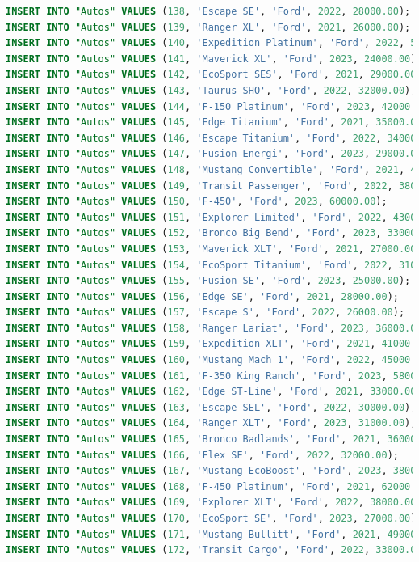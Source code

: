 \documentclass[12pt]{article}
\begin{document}
\begin{lstlisting}[language=SQL]
INSERT INTO "Autos" VALUES (138, 'Escape SE', 'Ford', 2022, 28000.00);
INSERT INTO "Autos" VALUES (139, 'Ranger XL', 'Ford', 2021, 26000.00);
INSERT INTO "Autos" VALUES (140, 'Expedition Platinum', 'Ford', 2022, 50000.00);
INSERT INTO "Autos" VALUES (141, 'Maverick XL', 'Ford', 2023, 24000.00);
INSERT INTO "Autos" VALUES (142, 'EcoSport SES', 'Ford', 2021, 29000.00);
INSERT INTO "Autos" VALUES (143, 'Taurus SHO', 'Ford', 2022, 32000.00);
INSERT INTO "Autos" VALUES (144, 'F-150 Platinum', 'Ford', 2023, 42000.00);
INSERT INTO "Autos" VALUES (145, 'Edge Titanium', 'Ford', 2021, 35000.00);
INSERT INTO "Autos" VALUES (146, 'Escape Titanium', 'Ford', 2022, 34000.00);
INSERT INTO "Autos" VALUES (147, 'Fusion Energi', 'Ford', 2023, 29000.00);
INSERT INTO "Autos" VALUES (148, 'Mustang Convertible', 'Ford', 2021, 47000.00);
INSERT INTO "Autos" VALUES (149, 'Transit Passenger', 'Ford', 2022, 38000.00);
INSERT INTO "Autos" VALUES (150, 'F-450', 'Ford', 2023, 60000.00);
INSERT INTO "Autos" VALUES (151, 'Explorer Limited', 'Ford', 2022, 43000.00);
INSERT INTO "Autos" VALUES (152, 'Bronco Big Bend', 'Ford', 2023, 33000.00);
INSERT INTO "Autos" VALUES (153, 'Maverick XLT', 'Ford', 2021, 27000.00);
INSERT INTO "Autos" VALUES (154, 'EcoSport Titanium', 'Ford', 2022, 31000.00);
INSERT INTO "Autos" VALUES (155, 'Fusion SE', 'Ford', 2023, 25000.00);
INSERT INTO "Autos" VALUES (156, 'Edge SE', 'Ford', 2021, 28000.00);
INSERT INTO "Autos" VALUES (157, 'Escape S', 'Ford', 2022, 26000.00);
INSERT INTO "Autos" VALUES (158, 'Ranger Lariat', 'Ford', 2023, 36000.00);
INSERT INTO "Autos" VALUES (159, 'Expedition XLT', 'Ford', 2021, 41000.00);
INSERT INTO "Autos" VALUES (160, 'Mustang Mach 1', 'Ford', 2022, 45000.00);
INSERT INTO "Autos" VALUES (161, 'F-350 King Ranch', 'Ford', 2023, 58000.00);
INSERT INTO "Autos" VALUES (162, 'Edge ST-Line', 'Ford', 2021, 33000.00);
INSERT INTO "Autos" VALUES (163, 'Escape SEL', 'Ford', 2022, 30000.00);
INSERT INTO "Autos" VALUES (164, 'Ranger XLT', 'Ford', 2023, 31000.00);
INSERT INTO "Autos" VALUES (165, 'Bronco Badlands', 'Ford', 2021, 36000.00);
INSERT INTO "Autos" VALUES (166, 'Flex SE', 'Ford', 2022, 32000.00);
INSERT INTO "Autos" VALUES (167, 'Mustang EcoBoost', 'Ford', 2023, 38000.00);
INSERT INTO "Autos" VALUES (168, 'F-450 Platinum', 'Ford', 2021, 62000.00);
INSERT INTO "Autos" VALUES (169, 'Explorer XLT', 'Ford', 2022, 38000.00);
INSERT INTO "Autos" VALUES (170, 'EcoSport SE', 'Ford', 2023, 27000.00);
INSERT INTO "Autos" VALUES (171, 'Mustang Bullitt', 'Ford', 2021, 49000.00);
INSERT INTO "Autos" VALUES (172, 'Transit Cargo', 'Ford', 2022, 33000.00);

\end{lstlisting}
\end{document}

